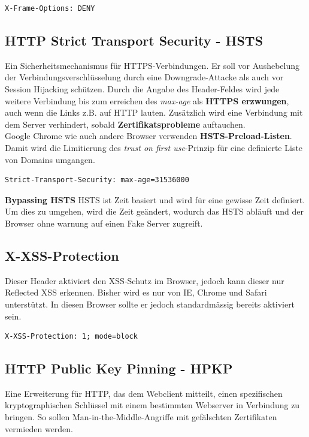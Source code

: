 \begin{lstlisting}[caption=Clickjacking mittels X-Frame-Options unterbinden, language={}]
X-Frame-Options: DENY
\end{lstlisting}

\subsection{HTTP Strict Transport Security - HSTS}
Ein Sicherheitsmechanismus für HTTPS-Verbindungen. Er soll vor Aushebelung der Verbindungsverschlüsselung durch eine Downgrade-Attacke als auch vor Session Hijacking schützen. Durch die Angabe des Header-Feldes wird jede weitere Verbindung bis zum erreichen des \textit{max-age} als \textbf{HTTPS erzwungen}, auch wenn die Links z.B. auf HTTP lauten. Zusätzlich wird eine Verbindung mit dem Server verhindert, sobald \textbf{Zertifikatsprobleme} auftauchen.\\

Google Chrome wie auch andere Browser verwenden \textbf{HSTS-Preload-Listen}. Damit wird die Limitierung des \textit{trust on first use}-Prinzip für eine definierte Liste von Domains umgangen.

\begin{lstlisting}[language={},caption=HSTS-Header]
Strict-Transport-Security: max-age=31536000
\end{lstlisting}

\textbf{Bypassing HSTS}
HSTS ist Zeit basiert und wird für eine gewisse Zeit definiert. Um dies zu umgehen, wird die Zeit geändert, wodurch das HSTS abläuft und der Browser ohne warnung auf einen Fake Server zugreift.

\subsection{X-XSS-Protection}
Dieser Header aktiviert den XSS-Schutz im Browser, jedoch kann dieser nur Reflected XSS erkennen. Bisher wird es nur von IE, Chrome und Safari unterstützt. In diesen Browser sollte er jedoch standardmässig bereits aktiviert sein.

\begin{lstlisting}[language={},caption=Beispiel des X-XSS-Protection Headers]
X-XSS-Protection: 1; mode=block
\end{lstlisting}

\subsection{HTTP Public Key Pinning - HPKP}
Eine Erweiterung für HTTP, das dem Webclient mitteilt, einen spezifischen kryptographischen Schlüssel mit einem bestimmten Webserver in Verbindung zu bringen. So sollen Man-in-the-Middle-Angriffe mit gefälschten Zertifikaten vermieden werden.\\

